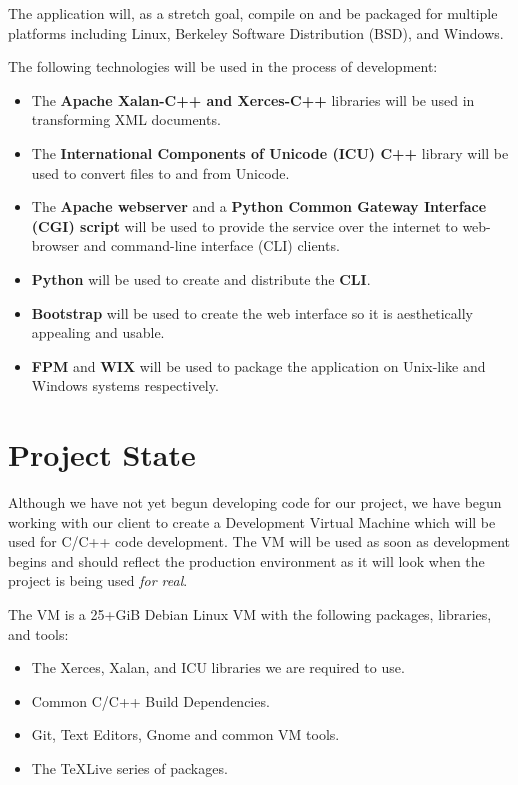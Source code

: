 The application will, as a stretch goal, compile on and be packaged for multiple platforms including Linux, Berkeley Software Distribution (BSD), and Windows.

The following technologies will be used in the process of development:
\begin{itemize}
    \item The \textbf{Apache Xalan-C++ and Xerces-C++} libraries will be used in transforming XML documents.
	\item The \textbf{International Components of Unicode (ICU) C++} library will be used to convert files to and from Unicode.
	\item The \textbf{Apache webserver} and a \textbf{Python Common Gateway Interface (CGI) script} will be used to provide the service over the internet to web-browser and command-line interface (CLI) clients.
    \item \textbf{Python} will be used to create and distribute the \textbf{CLI}.
    \item \textbf{Bootstrap} will be used to create the web interface so it is aesthetically appealing and usable. 
    \item \textbf{FPM} and \textbf{WIX} will be used to package the application on Unix-like and Windows systems respectively.
\end{itemize}

\section{Project State}

Although we have not yet begun developing code for our project, we have begun working with our client to create a Development Virtual Machine which will be used for C/C++ code development.
The VM will be used as soon as development begins and should reflect the production environment as it will look when the project is being used \textit{for real}.

The VM is a 25+GiB Debian Linux VM with the following packages, libraries, and tools:

\begin{itemize}
    \item The Xerces, Xalan, and ICU libraries we are required to use.
	\item Common C/C++ Build Dependencies.
    \item Git, Text Editors, Gnome and common VM tools.
	\item The TeXLive series of packages.
\end{itemize}

